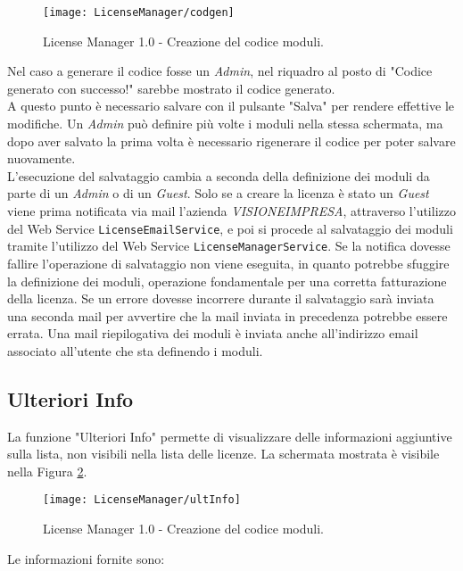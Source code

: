 \begin{figure}[!h] 
    \centering 
    \texttt{[image: LicenseManager/codgen]} 
    \caption{License Manager 1.0 - Creazione del codice moduli.}
\label{codcreat}
\end{figure}

Nel caso a generare il codice fosse un \textit{Admin}, nel riquadro al posto di "Codice generato con successo!" sarebbe mostrato il codice generato.
\\
A questo punto è necessario salvare con il pulsante "Salva" per rendere effettive le modifiche.
Un \textit{Admin} può definire più volte i moduli nella stessa schermata, ma dopo aver salvato la prima volta è necessario rigenerare il codice per poter salvare nuovamente.\\
L’esecuzione del salvataggio cambia a seconda della definizione dei moduli da parte di un \textit{Admin} o di un \textit{Guest}.
Solo se a creare la licenza è stato un \textit{Guest} viene prima notificata via mail l'azienda \textit{VISIONEIMPRESA}, attraverso l'utilizzo del Web Service \texttt{LicenseEmailService}, e poi si procede al salvataggio dei moduli tramite l'utilizzo del Web Service \texttt{LicenseManagerService}. Se la notifica dovesse fallire l’operazione di salvataggio non viene eseguita, in quanto potrebbe sfuggire la definizione dei moduli, operazione fondamentale per una corretta fatturazione della licenza. Se un errore dovesse incorrere durante il salvataggio sarà inviata una seconda mail per avvertire che la mail inviata in precedenza potrebbe essere errata.
Una mail riepilogativa dei moduli è inviata anche all'indirizzo email associato all'utente che sta definendo i moduli.

\newpage

\subsection{Ulteriori Info}
La funzione "Ulteriori Info" permette di visualizzare delle informazioni aggiuntive sulla lista, non visibili nella lista delle licenze.
La schermata mostrata è visibile nella Figura \ref{info}.


\begin{figure}[!h] 
    \centering 
    \texttt{[image: LicenseManager/ultInfo]} 
    \caption{License Manager 1.0 - Creazione del codice moduli.}
\label{info}
\end{figure}

Le informazioni fornite sono:

